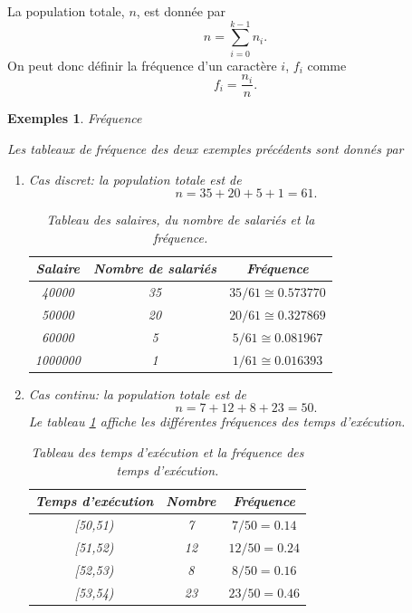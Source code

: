 \documentclass[a4paper,12pt]{book}
\newtheorem*{exemples}{Exemples}
\begin{document}
La population totale, $n$, est donnée par
\begin{equation}
 n=\sum_{i=0}^{k-1}n_i.
\end{equation}
On peut donc définir la fréquence d'un caractère $i$, $f_i$ comme
\begin{equation}
 f_i=\frac{n_i}{n}.
\end{equation}
\begin{exemples}{Fréquence}

Les tableaux de fréquence des deux exemples précédents sont donnés par
 \begin{enumerate}
  \item Cas discret: la population totale est de 
  \begin{equation}
   n=35+20+5+1=61.
  \end{equation}
  \begin{table}[htp]
  \begin{center}
  \begin{tabular}{|c|c|c|}
  \hline
  Salaire & Nombre de salariés & Fréquence\\
  \hline\hline
  40000 & 35 & $35/61\cong0.573770$\\
  \hline
  50000 & 20 & $20/61\cong0.327869$\\
  \hline
  60000 & 5 & $5/61\cong0.081967$ \\
  \hline
  1000000 & 1 & $1/61\cong0.016393$ \\
  \hline
  \end{tabular}
  \end{center}
  \caption{Tableau des salaires, du nombre de salariés et la fréquence.}
  \end{table}

  \item Cas continu: la population totale est de 
  \begin{equation}
   n=7+12+8+23=50.
  \end{equation}
  Le tableau \ref{table_exec_freq} affiche les différentes fréquences des temps d'exécution.
  \begin{table}[htp]
\begin{center}
\begin{tabular}{|c|c|c|}
\hline
 Temps d'exécution & Nombre & Fréquence \\
 \hline\hline
 [50,51) & 7 & $7/50=0.14$\\
 \hline
 [51,52) & 12 & $12/50=0.24$ \\
 \hline
 [52,53) & 8 & $8/50=0.16$ \\
 \hline
 [53,54) & 23 & $23/50=0.46$ \\
 \hline
\end{tabular}
\end{center}
\caption{Tableau des temps d'exécution et la fréquence des temps d'exécution.}\label{table_exec_freq}
\end{table}

 \end{enumerate}
\end{exemples}
\end{document}

